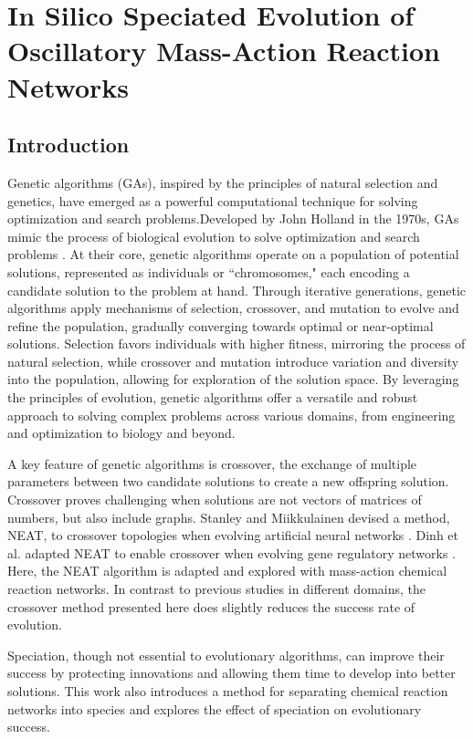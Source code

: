 \documentclass[12pt]{report}
\begin{document}
\chapter{In Silico Speciated Evolution of Oscillatory Mass-Action Reaction Networks}
\label{chap: ReactionNetworkEvolution.jl}
\section{Introduction}
Genetic algorithms (GAs), inspired by the principles of natural selection and genetics, have emerged as a powerful computational technique for solving optimization and search problems.Developed by John Holland in the 1970s, GAs mimic the process of biological evolution to solve optimization and search problems \cite{holland_1975}. At their core, genetic algorithms operate on a population of potential solutions, represented as individuals or ``chromosomes," each encoding a candidate solution to the problem at hand. Through iterative generations, genetic algorithms apply mechanisms of selection, crossover, and mutation to evolve and refine the population, gradually converging towards optimal or near-optimal solutions. Selection favors individuals with higher fitness, mirroring the process of natural selection, while crossover and mutation introduce variation and diversity into the population, allowing for exploration of the solution space. By leveraging the principles of evolution, genetic algorithms offer a versatile and robust approach to solving complex problems across various domains, from engineering and optimization to biology and beyond.

A key feature of genetic algorithms is crossover, the exchange of multiple parameters between two candidate solutions to create a new offspring solution. Crossover proves challenging when solutions are not vectors of matrices of numbers, but also include graphs. Stanley and  Miikkulainen devised a method, NEAT, to crossover topologies when evolving artificial neural networks \cite{stanley_evolving_2002}. Dinh et al. adapted NEAT to enable crossover when evolving gene regulatory networks \cite{dinh_effective_2015}. Here, the NEAT algorithm is adapted and explored with mass-action chemical reaction networks. In contrast to previous studies in different domains, the crossover method presented here does slightly reduces the success rate of evolution. 

Speciation, though not essential to evolutionary algorithms, can improve their success by protecting innovations and allowing them time to develop into better solutions. This work also introduces a method for separating chemical reaction networks into species and explores the effect of speciation on evolutionary success.
\end{document}
